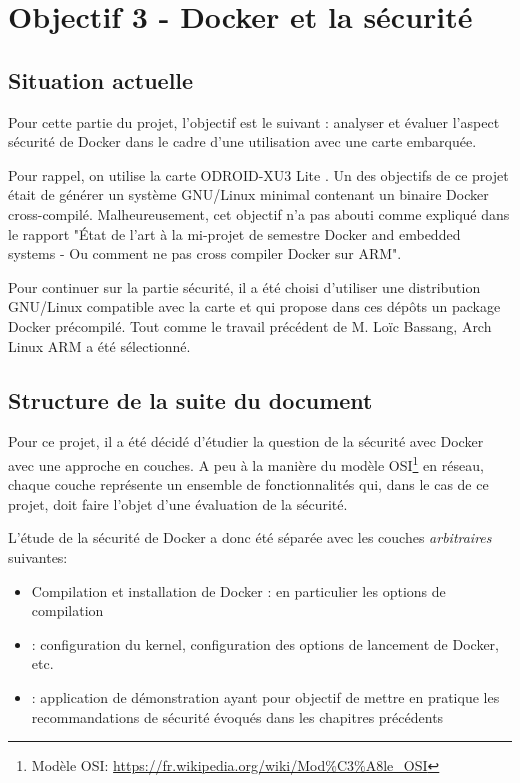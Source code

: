 \documentclass[11pt,a4paper,oneside]{report}
\newcommand{\oldreportname}{État de l’art à la mi-projet de semestre Docker and embedded systems - Ou comment ne pas cross compiler Docker sur ARM}
\newcommand{\odroid}{ODROID-XU3 Lite }
\begin{document}
\chapter{Objectif 3 - Docker et la sécurité}

\section{Situation actuelle}
Pour cette partie du projet, l'objectif est le suivant : analyser et évaluer l'aspect sécurité de Docker dans le cadre d'une utilisation avec une carte embarquée.

Pour rappel, on utilise la carte \odroid. Un des objectifs de ce projet était de générer un système GNU/Linux minimal contenant un binaire Docker cross-compilé. Malheureusement, cet objectif n'a pas abouti comme expliqué dans le rapport "\oldreportname".

Pour continuer sur la partie sécurité, il a été choisi d'utiliser une distribution GNU/Linux compatible avec la carte et qui propose dans ces dépôts un package Docker précompilé. Tout comme le travail précédent de M. Loïc Bassang, Arch Linux ARM a été sélectionné.

\section{Structure de la suite du document}

Pour ce projet, il a été décidé d'étudier la question de la sécurité avec Docker avec une approche en couches. A peu à la manière du modèle OSI\footnote{Modèle OSI: \url{https://fr.wikipedia.org/wiki/Mod\%C3\%A8le_OSI}} en réseau, chaque couche représente un ensemble de fonctionnalités qui, dans le cas de ce projet, doit faire l'objet d'une évaluation de la sécurité.

L'étude de la sécurité de Docker a donc été séparée avec les couches \textit{arbitraires} suivantes:

\begin{itemize}

\item Compilation et installation de Docker : en particulier les options  de compilation

\item {} : configuration du kernel, configuration des options de lancement de Docker, etc.

\item {} : application de démonstration ayant pour objectif de mettre en pratique les recommandations de sécurité évoqués dans les chapitres précédents

\end{itemize}
\end{document}

